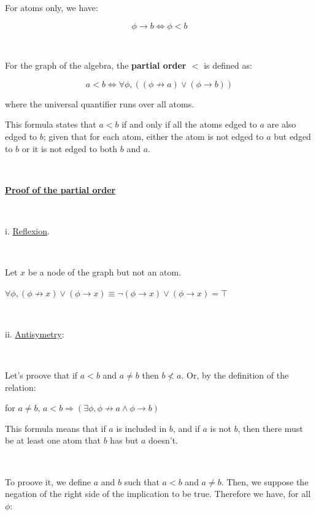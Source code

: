 \documentclass[a4paper, 11pt]{article}
\begin{document}
For atoms only, we have:

\begin{equation*}
    \phi \rightarrow b \Leftrightarrow \phi < b
\end{equation*}

\

\begin{tcolorbox}
For the graph of the algebra, the \textbf{partial order $<$} is defined as:

\begin{equation}
    a < b \Leftrightarrow \forall \phi, ((\phi \not\rightarrow a) \lor (\phi \rightarrow b))
\end{equation}

where the universal quantifier runs over all atoms. 
\end{tcolorbox}

This formula states that $a < b$ if and only if all the atoms edged to $a$ are also edged to $b$; given that for each atom, either the atom is not edged to $a$ but edged to $b$ or it is not edged to both $b$ and $a$. 

\

\underline{\textbf{Proof of the partial order}}

\

i. \underline{Reflexion}.

\

Let $x$ be a node of the graph but not an atom.

$\forall \phi, (\phi \not\rightarrow x) \lor (\phi \rightarrow x) \equiv \neg(\phi \rightarrow x) \lor (\phi \rightarrow x) = \top$

\

ii. \underline{Antisymetry}:

\

Let's proove that if $a < b$ and $a \neq b$ then $b \not< a$. Or, by the definition of the relation:

\begin{center}
    for $a \neq b$, $a < b \Rightarrow (\exists \phi, \phi \not\rightarrow a \land \phi \rightarrow b)$
\end{center}

This formula means that if $a$ is included in $b$, and if $a$ is not $b$, then there must be at least one atom that $b$ has but $a$ doesn't. 

\

To proove it, we define $a$ and $b$ such that $a < b$ and $a \neq b$. Then, we suppose the negation of the right side of the implication to be true. Therefore we have, for all $\phi$:
\end{document}
